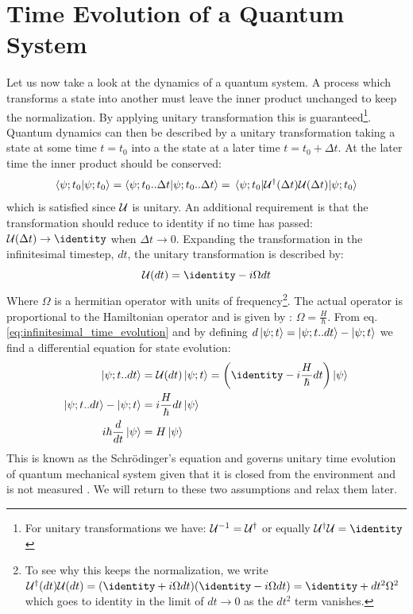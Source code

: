 \section{Time Evolution of a Quantum System}\label{sec:scroedinger}
Let us now take a look at the dynamics of a quantum system. A process which transforms a state into another must leave the inner product unchanged to keep the normalization. By applying unitary transformation this is guaranteed\footnote{For unitary transformations we have: $\mathcal{U}^{-1} = \mathcal{U}^\dagger$ or equally $\unitary^\dagger\unitary = \identity$}. Quantum dynamics can then be described by a unitary transformation taking a state at some time $t = t_0$ into a the state at a later time $t = t_0 + \Delta t$. At the later time the inner product should be conserved:
\begin{equation}
    \braket{\psi; t_0}{\psi; t_0} = \braket{\psi; t_0 .. \Delta t}{\psi; t_0 .. \Delta t} = \mel{\psi; t_0}{\mathcal{U}^\dagger (\Delta t) \mathcal{U}(\Delta t)}{\psi; t_0} 
\end{equation}
which is satisfied since $\mathcal{U}$ is unitary. An additional requirement is that the transformation should reduce to identity if no time has passed: $\unitary(\Delta t) \to \identity$ when $\Delta t \to 0$. Expanding the transformation in the infinitesimal timestep, $dt$, the unitary transformation is described by:
\begin{equation}\label{eq:infinitesimal_time_evolution}
    \unitary(dt) = \identity - i \Omega dt
\end{equation}
Where $\Omega$ is a hermitian operator with units of frequency\footnote{To see why this keeps the normalization, we write $\unitary^\dagger(dt)\unitary(dt) = (\identity + i \Omega dt)(\identity - i \Omega dt) = \identity + dt^2 \Omega^2$ which goes to identity in the limit of $dt \to 0$ as the $dt^2$ term vanishes.}. 
The actual operator is proportional to the Hamiltonian operator and is given by : $\Omega = \frac{H}{\hbar}$. From eq. \ref{eq:infinitesimal_time_evolution} and by defining $d\ket{\psi; t} = \ket{\psi; t..dt} - \ket{\psi; t} $ we find a differential equation for state evolution:
\begin{align}
    \ket{\psi; t..dt} &= \unitary(dt) \ket{\psi; t} = \left(\identity - i \frac{H}{\hbar}   dt\right) \ket{\psi} \\
    \ket{\psi; t..dt} - \ket{\psi; t} &= i \frac{H}{\hbar}   dt \ket{\psi} \\
    i \hbar \frac{d}{dt}\ket{\psi} &=  H \ket{\psi}
\end{align}
This is known as the Schrödinger's equation and governs unitary time evolution of quantum mechanical system given that it is closed from the environment and is not measured \cite{sakurai_modern_2021}. We will return to these two assumptions and relax them later.

